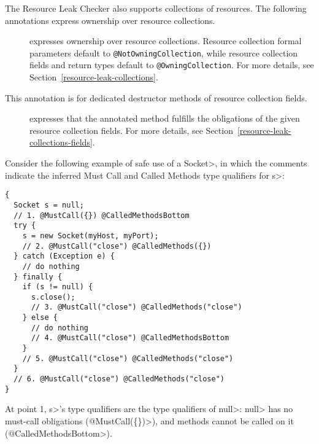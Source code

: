 The Resource Leak Checker also supports collections of resources. The following annotations express ownership over resource collections.

\begin{description}
\item[]
\item[]
  expresses ownership over resource collections. Resource collection formal parameters default to \texttt{@NotOwningCollection}, while resource collection fields and return types default to \texttt{@OwningCollection}.
  For more details, see Section~\ref{resource-leak-collections}.

\end{description}

This annotation is for dedicated destructor methods of resource collection fields.

\begin{description}
\item[]
  expresses that the annotated method fulfills the obligations of the given resource collection fields.
  For more details, see Section~\ref{resource-leak-collections-fields}.

\end{description}



Consider the following example of safe use of a \<Socket>, in which the comments indicate the
inferred Must Call and Called Methods type qualifiers for \<s>:
\begin{verbatim}
{
  Socket s = null;
  // 1. @MustCall({}) @CalledMethodsBottom
  try {
    s = new Socket(myHost, myPort);
    // 2. @MustCall("close") @CalledMethods({})
  } catch (Exception e) {
    // do nothing
  } finally {
    if (s != null) {
      s.close();
      // 3. @MustCall("close") @CalledMethods("close")
    } else {
      // do nothing
      // 4. @MustCall("close") @CalledMethodsBottom
    }
    // 5. @MustCall("close") @CalledMethods("close")
  }
  // 6. @MustCall("close") @CalledMethods("close")
}
\end{verbatim}

At point 1, \<s>'s type qualifiers are the type qualifiers of \<null>:
\<null> has no must-call obligations (\<@MustCall(\{\})>),
and methods cannot be called on it (\<@CalledMethodsBottom>).

